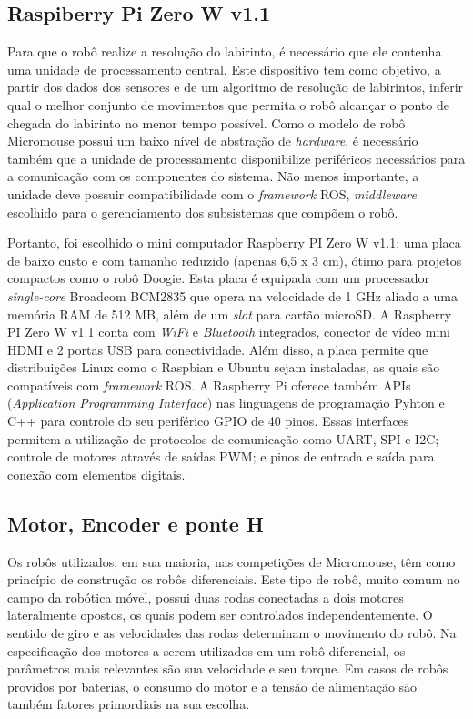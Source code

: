 \subsection{Raspiberry Pi Zero W v1.1}
\label{ssec:raspiberry_pi_zero}
Para que o robô realize a resolução do labirinto, é necessário que ele contenha uma unidade de processamento central. Este dispositivo tem como objetivo, a partir dos dados dos sensores e de um algoritmo de resolução de labirintos, inferir qual o melhor conjunto de movimentos que permita o robô alcançar o ponto de chegada do labirinto no menor tempo possível. Como o modelo de robô Micromouse possui um baixo nível de abstração de \textit{hardware}, é necessário também que a unidade de processamento disponibilize periféricos necessários para a comunicação com os componentes do sistema. Não menos importante, a unidade deve possuir compatibilidade com o \textit{framework} ROS, \textit{middleware }escolhido para o gerenciamento dos subsistemas que compõem o robô.

Portanto, foi escolhido o mini computador Raspberry PI Zero W v1.1: uma placa de baixo custo e com tamanho reduzido (apenas 6,5 x 3 cm), ótimo para projetos compactos como o robô Doogie. Esta placa é equipada com um processador \textit{single-core} Broadcom BCM2835 que opera na velocidade de 1 GHz aliado a uma memória RAM de 512 MB, além de um \textit{slot} para cartão microSD. A Raspberry PI Zero W v1.1 conta com \textit{WiFi} e \textit{Bluetooth} integrados, conector de vídeo mini HDMI e 2 portas USB para conectividade. Além disso, a placa permite que distribuições Linux como o Raspbian e Ubuntu sejam instaladas, as quais são compatíveis com \textit{framework} ROS. A Raspberry Pi oferece também APIs (\textit{Application Programming Interface}) nas linguagens de programação Pyhton e C++ para controle do seu periférico GPIO de 40 pinos. Essas interfaces permitem a utilização de protocolos de comunicação como UART, SPI e I2C; controle de motores através de saídas PWM; e pinos de entrada e saída para conexão com elementos digitais.

\subsection{Motor, Encoder e ponte H}
\label{ssec:motor_encoder_ponte-h}
Os robôs utilizados, em sua maioria, nas competições de Micromouse, têm como princípio de construção os robôs diferenciais. Este tipo de robô, muito comum no campo da robótica móvel, possui duas rodas conectadas a dois motores lateralmente opostos, os quais podem ser controlados independentemente. O sentido de giro e as velocidades das rodas determinam  o movimento do robô. Na especificação dos motores a serem utilizados em um robô diferencial, os parâmetros mais relevantes são sua velocidade e seu torque. Em casos de robôs providos por baterias, o consumo do motor e a tensão de alimentação são também fatores primordiais na sua escolha.

